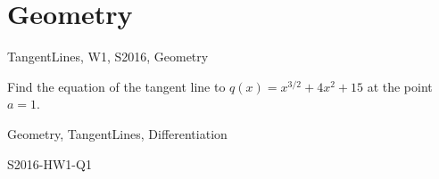 \section{Geometry}

\begin{tagblock}{TangentLines, W1, S2016, Geometry}
\begin{question}
	Find the equation of the tangent line to $q(x)=x^{3/2}+4x^2+15$ at the point $a=1$.
	
	
\begin{tags}
	    Geometry, TangentLines, Differentiation
\end{tags}
	
\begin{diary}
	    S2016-HW1-Q1
\end{diary}
	
\begin{solution}
	   
\end{solution}
	
\end{question}

\end{tagblock}

